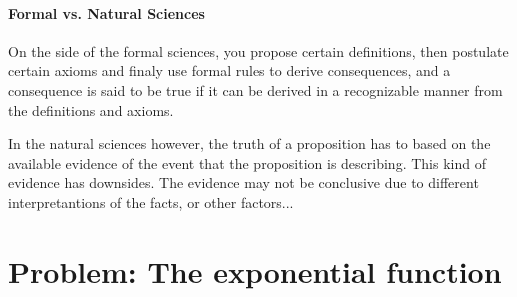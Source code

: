 \paragraph{Formal vs. Natural Sciences}
On the side of the formal sciences, you propose certain definitions, 
then postulate certain axioms and finaly use formal rules to derive 
consequences, and a consequence is said to be true if it can be
derived in a recognizable manner from the definitions and axioms.

In the natural sciences however, the truth of a proposition has
to based on the available evidence of the event that the proposition
is describing. This kind of evidence has downsides. The evidence may
not be conclusive due to different interpretantions of the facts, or 
other factors...



\section{Problem: The exponential function}



